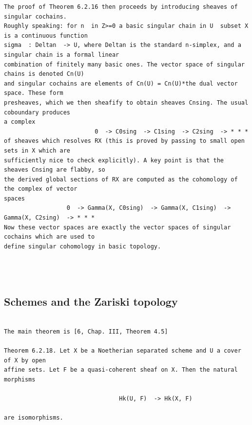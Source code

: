 \begin{Verbatim}[fontsize=\footnotesize]
The proof of Theorem 6.2.16 then proceeds by introducing sheaves of singular cochains.
Roughly speaking: for n  in Z>=0 a basic singular chain in U  subset X is a continuous function
sigma  : Deltan  -> U, where Deltan is the standard n-simplex, and a singular chain is a formal linear
combination of finitely many basic ones. The vector space of singular chains is denoted Cn(U)
and singular cochains are elements of Cn(U) = Cn(U)*the dual vector space. These form
presheaves, which we then sheafify to obtain sheaves Cnsing. The usual coboundary produces
a complex
                          0  -> C0sing  -> C1sing  -> C2sing  -> * * *
of sheaves which resolves RX (this is proved by passing to small open sets in X which are
sufficiently nice to check explicitly). A key point is that the sheaves Cnsing are flabby, so
the derived global sections of RX are computed as the cohomology of the complex of vector
spaces
                  0  -> Gamma(X, C0sing)  -> Gamma(X, C1sing)  -> Gamma(X, C2sing)  -> * * *
Now these vector spaces are exactly the vector spaces of singular cochains which are used to
define singular cohomology in basic topology.




\end{Verbatim}

\subsection{Schemes and the Zariski topology}
\label{subsection-jethro-cech-8}
\begin{Verbatim}[fontsize=\footnotesize]

The main theorem is [6, Chap. III, Theorem 4.5]

Theorem 6.2.18. Let X be a Noetherian separated scheme and U a cover of X by open
affine sets. Let F be a quasi-coherent sheaf on X. Then the natural morphisms

                                 Hk(U, F)  -> Hk(X, F)

are isomorphisms.



\end{Verbatim}

